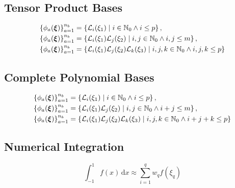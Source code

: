 \subsection{Tensor Product Bases}

\begin{equation}
\begin{aligned}
\left\{ \phi_a(\boldsymbol{\xi}) \right\}_{a=1}^{n_b} &=
  \left\{ \mathcal{L}_i(\xi_1) \; | \; i \in \mathbb{N}_0 \land i \leq p
  \right\}, \\
\left\{ \phi_a(\boldsymbol{\xi}) \right\}_{a=1}^{n_b} &=
  \left\{ \mathcal{L}_i(\xi_1) \mathcal{L}_j(\xi_2) \; | \; i,j \in
  \mathbb{N}_0 \land i,j \leq m \right\}, \\
\left\{ \phi_a(\boldsymbol{\xi}) \right\}_{a=1}^{n_b} &=
  \left\{ \mathcal{L}_i(\xi_1) \mathcal{L}_j(\xi_2) \mathcal{L}_k(\xi_3) \; |
  \; i,j,k \in \mathbb{N}_0 \land i,j,k \leq p \right\}
\end{aligned}
\label{eq:tensor_basis}
\end{equation}

\subsection{Complete Polynomial Bases}

\begin{equation}
\begin{aligned}
\left\{ \phi_a(\boldsymbol{\xi}) \right\}_{a=1}^{n_b} &=
  \left\{ \mathcal{L}_i(\xi_1) \; | \; i \in \mathbb{N}_0 \land i \leq p
  \right\}, \\
\left\{ \phi_a(\boldsymbol{\xi}) \right\}_{a=1}^{n_b} &=
  \left\{ \mathcal{L}_i(\xi_1) \mathcal{L}_j(\xi_2) \; | \; i,j \in
  \mathbb{N}_0 \land i + j \leq m \right\}, \\
\left\{ \phi_a(\boldsymbol{\xi}) \right\}_{a=1}^{n_b} &=
  \left\{ \mathcal{L}_i(\xi_1) \mathcal{L}_j(\xi_2) \mathcal{L}_k(\xi_3) \; |
  \; i,j,k \in \mathbb{N}_0 \land i + j + k \leq p \right\}
\end{aligned}
\label{eq:complete_basis}
\end{equation}

\subsection{Numerical Integration}

\begin{equation}
\int_{-1}^{1} f(x) \, \text{d}x \approx \sum_{i=1}^{q} w_q f(\xi_q)
\end{equation}
